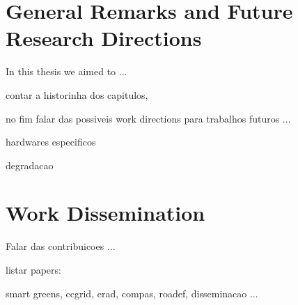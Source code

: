 \section{General Remarks and Future Research Directions}

In this thesis we aimed to ... 

contar a historinha dos capitulos,

no fim falar das possiveis work directions para trabalhos futuros ...

hardwares especificos

degradacao

\section{Work Dissemination}

Falar das contribuicoes ...

listar papers:

smart greens,
ccgrid,
erad, compas, roadef, disseminacao ...

